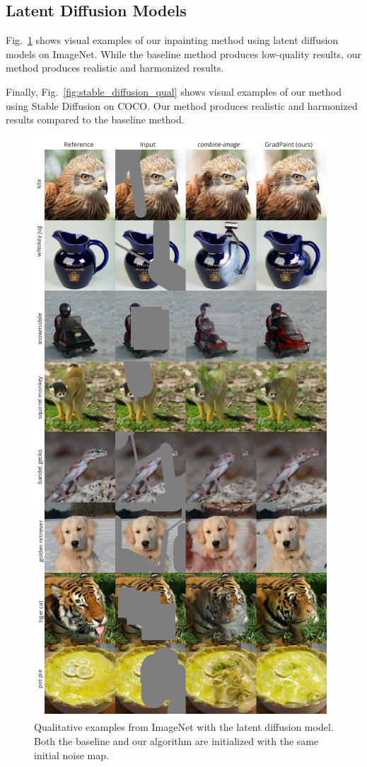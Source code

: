 \subsection{Latent Diffusion Models}

Fig.~\ref{fig:qualitative_latent_imagenet} shows visual examples of our inpainting method using 
latent diffusion models on ImageNet. While the baseline method produces low-quality results, our method produces 
realistic and harmonized results.  

Finally, Fig.~\ref{fig:stable_diffusion_qual} shows visual examples of our method using Stable Diffusion on COCO. 
Our method produces realistic and harmonized results compared to the baseline method. 

\begin{figure}[H]
  \centering
  \includegraphics[width=0.625\linewidth]{images/gradpaint/in_latent_samples.pdf}
  \caption{Qualitative examples from ImageNet with the latent diffusion model. Both the baseline and our algorithm are initialized with the same initial noise map.}
\label{fig:qualitative_latent_imagenet}
\end{figure}



